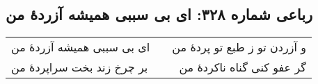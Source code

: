 \begin{center}
\section*{رباعی شماره ۳۲۸: ای بی سببی همیشه آزردهٔ من}
\label{sec:sh328}
\begin{longtable}{l p{0.5cm} r}
ای بی سببی همیشه آزردهٔ من
&&
و آزردن تو ز طبع تو پردهٔ من
\\
بر چرخ زند بخت سراپردهٔ من
&&
گر عفو کنی گناه ناکردهٔ من
\\
\end{longtable}
\end{center}
